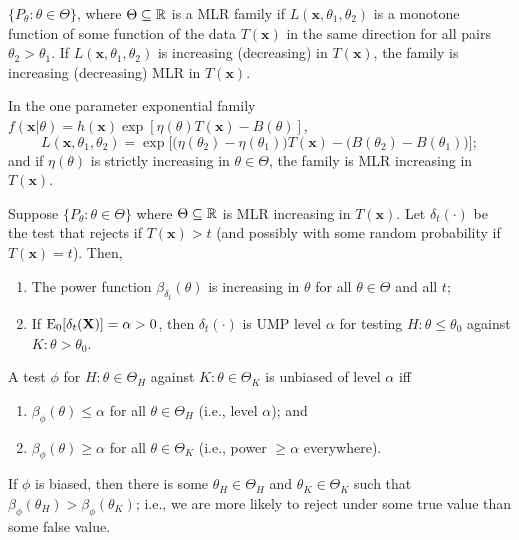 \documentclass[8pt,letterpaper, landscape]{extarticle} %
\newcommand{\mX}{\ensuremath{\mathbf{X}}}
\newcommand{\mx}{\ensuremath{\mathbf{x}}}
\begin{document}
\begin{multicols}{3}
\begin{description}
 $ \{ P_\theta \colon \theta \in \Theta \} $, where $ \Theta \subseteq \mathbb{R} $ is a MLR family if $ L(\mx, \theta_1, \theta_2) $ is a monotone function of some function of the data $ T(\mx) $ in the same direction for all pairs $ \theta_2 > \theta_1 $. If $ L(\mx, \theta_1, \theta_2) $ is increasing (decreasing) in $ T(\mx) $, the family is increasing (decreasing) MLR in $ T(\mx) $.

In the one parameter exponential family $ f(\mx | \theta) = h(\mx) \exp [\eta (\theta) T(\mx) - B(\theta)] $,
$$ L(\mx, \theta_1, \theta_2) = \exp \big[ \big( \eta(\theta_2) - \eta(\theta_1) \big) T(\mx) - \big( B(\theta_2) - B(\theta_1) \big) \big]; $$
and if $ \eta(\theta) $ is strictly increasing in $ \theta \in \Theta $, the family is MLR increasing in $ T(\mx) $.

Suppose $ \{ P_\theta \colon \theta \in \Theta \} $ where $ \Theta \subseteq \mathbb{R} $ is MLR increasing in $ T(\mx) $. Let $ \delta_t(\cdot) $ be the test that rejects if $ T(\mx) > t $ (and possibly with some random probability if $ T(\mx) = t $). Then,
\begin{enumerate}
\item The power function $ \beta_{\delta_t} (\theta) $ is increasing in $ \theta $ for all $ \theta \in \Theta $ and all $ t $;
\item If $ \E_{0} [\delta_t (\mX)] = \alpha > 0 $, then $ \delta_t (\cdot) $ is UMP level $ \alpha $ for testing $ H \colon \theta \leq \theta_0 $ against $ K \colon \theta > \theta_0 $.
\end{enumerate}

 A test $ \phi $ for $ H \colon \theta \in \Theta_H $ against $ K \colon \theta \in \Theta_K $ is unbiased of level $ \alpha $ iff
\begin{enumerate}
\item $ \beta_\phi (\theta) \leq \alpha $ for all $ \theta \in \Theta_H $ (i.e., level $ \alpha $); and
\item $ \beta_\phi (\theta) \geq \alpha $ for all $ \theta \in \Theta_K $ (i.e., power $ \geq \alpha $ everywhere).
\end{enumerate}
If $ \phi $ is biased, then there is some $ \theta_{H} \in \Theta_{H} $ and $ \theta_{K} \in \Theta_{K} $ such that $ \beta_\phi (\theta_H) > \beta_\phi (\theta_K) $; i.e., we are more likely to reject under some true value than some false value.


\end{description}
\end{multicols}
\end{document}
